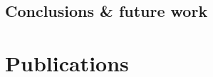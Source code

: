 \documentclass[electronic,oldfontcommands]{kthesis}
\begin{document}
\chapter{Conclusions \& future work}\label{chap:conclusions}


\renewcommand\chaptername{\newchaptername}
\renewcommand*{\thechapter}{\Alph{chapter}}
\part{Publications}\label{part:publications}








\backmatter%
%
\printglossary[type=\acronymtype]%

\end{document}
